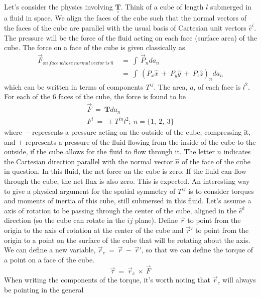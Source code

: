 \hskip 25pt Let's consider the physics involving $\underline{\underline{\mathbf{T}}}$.  Think of a cube of
length $l$ submerged in a fluid in space.  We align the faces of the cube such that the normal vectors of the faces of
the cube are parallel with the usual basis of Cartesian unit vectors $\hat{e}^{i}$.  The pressure will be the
force of the fluid acting on each face (surface area) of the cube.  The force on a face of the cube is given classically as
\begin{align*}
  \vec{F}_{\mathit{on\ face\ whose\ normal\ vector\ is}\ \hat{n}}\ &=\ \int\ \vec{P}_n da_n \\
  &=\ \int\
  \left (P_x\hat{x}\ +\ P_y\hat{y}\ +\ P_z\hat{z}\right )_n da_n
\end{align*}
which can be written in terms of components $T^{ij}$.  The area, $a$, of each face is $l^2$.  For each of the 6 faces of
the cube, the force is found to be
\begin{gather}
  \vec{F}\ =\ \mathbf{T}da_n \\
  F^i\ =\ \pm T^{in}l^2;\ n=\{1,\ 2,\ 3\}
\end{gather}
where $-$ represents a pressure acting on the outside of the cube, compressing it, and $+$ represents a pressure of the fluid
flowing from the inside of the cube to the outside, if the cube allows for the fluid to flow through it.
The letter $n$ indicates the Cartesian direction parallel with the normal vector $\hat{n}$ of the face of the cube in
question.  In this fluid, the
net force on the cube is zero.  If the fluid can flow through the cube, the net flux is also zero.  This is expected.  An
interesting way to give a physical argument for the spatial symmetry of $T^{ij}$ is to consider torques and moments of
inertia of this cube, still submersed in this fluid.  Let's assume a axis of rotation to be passing through the center of
the cube, aligned in the $\hat{e}^k$ direction (so the cube can rotate in the $ij$ plane).  Define $\vec{r}$ to point from
the origin to the axis of rotation at the center of the cube and $\vec{r}'$ to point from the origin to a point on the
surface of the cube that will be rotating about the axis.  We can define a new variable,
$\vec{r}_c\ =\ \vec{r}\ -\ \vec{r}'$, so that we can define the torque of a point on a face of the cube.
\begin{equation}
  \vec{\tau}\ =\ \vec{r}_c\ \times\ \vec{F}
\end{equation}
When writing the components of the torque, it's worth noting that $\vec{r}_c$ will always be pointing in the general
